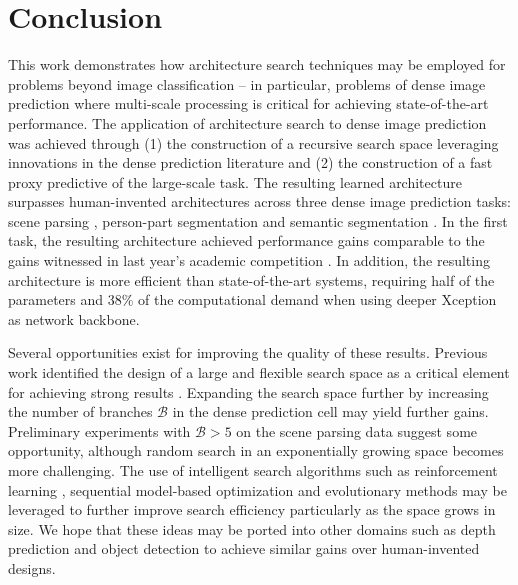 \documentclass{article}
\begin{document}
 \section{Conclusion}
\label{sec:conclusion}

This work demonstrates how architecture search techniques may be employed for problems beyond image classification -- in particular, problems of dense image prediction where multi-scale processing is critical for achieving state-of-the-art performance. The application of architecture search to dense image prediction was achieved through (1) the construction of a recursive search space leveraging innovations in the dense prediction literature and (2) the construction of a fast proxy predictive of the large-scale task. The resulting learned architecture surpasses human-invented architectures across three dense image prediction tasks: scene parsing \cite{Cordts2016Cityscapes}, person-part segmentation \cite{chen_cvpr14} and semantic segmentation \cite{everingham2014pascal}. In the first task, the resulting architecture achieved performance gains comparable to the gains witnessed in last year's academic competition \cite{Cordts2016Cityscapes}. In addition, the resulting architecture is more efficient than state-of-the-art systems, requiring half of the parameters and $38\%$ of the computational demand when using deeper Xception \cite{chollet2016xception, dai2017coco, deeplabv3plus2018} as network backbone.


Several opportunities exist for improving the quality of these results. Previous work identified the design of a large and flexible search space as a critical element for achieving strong results  \cite{zoph2017learning,liu2018progressive,zoph2017neural,pham2018efficient}.
Expanding the search space further by increasing the number of branches $\mathcal{B}$ in the dense prediction cell may yield further gains. Preliminary experiments with $\mathcal{B} > 5$ on the scene parsing data suggest some opportunity, although random search in an exponentially growing space becomes more challenging. The use of intelligent search algorithms such as reinforcement learning \cite{baker2017designing, zhong2018practical}, sequential model-based optimization \cite{negrinho2017deeparchitect, liu2018progressive}  and evolutionary methods \cite{stanley2002evolving, real2017large,miikkulainen2017evolving, xie2017genetic, liu2018hierarchical, real2018regularized} may be leveraged to further improve search efficiency particularly as the space grows in size. 
We hope that these ideas may be ported into other domains such as depth prediction \cite{silberman2012indoor} and object detection \cite{redmon2016you,liu2015ssd} to achieve similar gains over human-invented designs.
\end{document}

